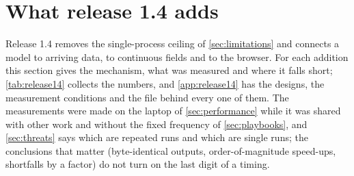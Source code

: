 \section{What release 1.4 adds}
\label{sec:release14}

Release 1.4 removes the single-process ceiling of \cref{sec:limitations} and connects a model
to arriving data, to continuous fields and to the browser. For each addition this section
gives the mechanism, what was measured and where it falls short; \cref{tab:release14}
collects the numbers, and \cref{app:release14} has the designs, the measurement conditions
and the file behind every one of them. The measurements were made on the laptop of
\cref{sec:performance} while it was shared with other work and without the fixed frequency of
\cref{sec:playbooks}, and \cref{sec:threats} says which are repeated runs and which are single
runs; the conclusions that matter (byte-identical outputs, order-of-magnitude speed-ups,
shortfalls by a factor) do not turn on the last digit of a timing.

